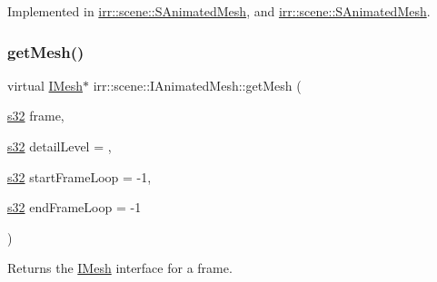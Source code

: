 Implemented in \hyperlink{structirr_1_1scene_1_1SAnimatedMesh_a132d5f643fe02b57480d945e8d5be2d2}{irr\+::scene\+::\+S\+Animated\+Mesh}, and \hyperlink{structirr_1_1scene_1_1SAnimatedMesh_a132d5f643fe02b57480d945e8d5be2d2}{irr\+::scene\+::\+S\+Animated\+Mesh}.

\mbox{\label{classirr_1_1scene_1_1IAnimatedMesh_adccb39fee83bed36a464cf7b96f3a0ca}} 
\subsubsection{\texorpdfstring{get\+Mesh()}{getMesh()}\hspace{0.1cm}{\footnotesize\ttfamily [2/2]}}
{\footnotesize\ttfamily virtual \hyperlink{classirr_1_1scene_1_1IMesh}{I\+Mesh}$\ast$ irr\+::scene\+::\+I\+Animated\+Mesh\+::get\+Mesh (\begin{DoxyParamCaption}\item[{\hyperlink{namespaceirr_ac66849b7a6ed16e30ebede579f9b47c6}{s32}}]{frame,  }\item[{\hyperlink{namespaceirr_ac66849b7a6ed16e30ebede579f9b47c6}{s32}}]{detail\+Level = {},  }\item[{\hyperlink{namespaceirr_ac66849b7a6ed16e30ebede579f9b47c6}{s32}}]{start\+Frame\+Loop = {\ttfamily -\/1},  }\item[{\hyperlink{namespaceirr_ac66849b7a6ed16e30ebede579f9b47c6}{s32}}]{end\+Frame\+Loop = {\ttfamily -\/1} }\end{DoxyParamCaption})\hspace{0.3cm}{\ttfamily [pure virtual]}}



Returns the \hyperlink{classirr_1_1scene_1_1IMesh}{I\+Mesh} interface for a frame. 


